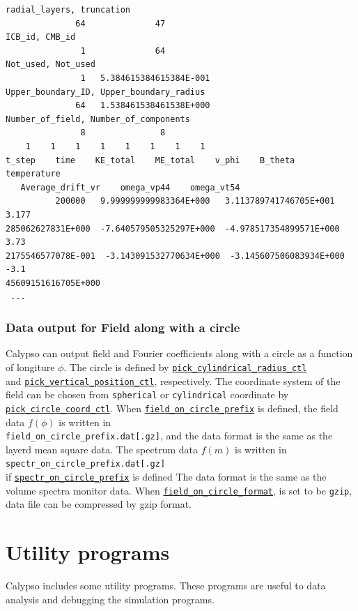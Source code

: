 {\small 
\begin{verbatim}
radial_layers, truncation
              64              47
ICB_id, CMB_id
               1              64
Not_used, Not_used
               1   5.384615384615384E-001
Upper_boundary_ID, Upper_boundary_radius
              64   1.538461538461538E+000
Number_of_field, Number_of_components
               8               8
    1    1    1    1    1    1    1    1
t_step    time    KE_total    ME_total    v_phi    B_theta    temperature 
   Average_drift_vr    omega_vp44    omega_vt54    
          200000   9.999999999983364E+000   3.113789741746705E+001   3.177
285062627831E+000  -7.640579505325297E+000  -4.978517354899571E+000   3.73
2175546577078E-001  -3.143091532770634E+000  -3.145607506083934E+000  -3.1
45609151616705E+000
 ...
\end{verbatim}
}
%
\subsubsection{Data output for Field along with a circle}
Calypso can output field and Fourier coefficients along with a circle as a function of longiture $\phi$. The circle is defined by \hyperref[href_t:pick_cylindrical_radius_ctl]{{\tt pick\_cylindrical\_radius\_ctl}} \\
and \hyperref[href_t:pick_vertical_position_ctl]{{\tt pick\_vertical\_position\_ctl}}, respectively. The coordinate system of the field can be chosen from {\tt spherical} or {\tt cylindrical} coordinate by \hyperref[href_t:pick_circle_coord_ctl]{{\tt pick\_circle\_coord\_ctl}}.
When \hyperref[href_t:field_on_circle_prefix]{{\tt field\_on\_circle\_prefix}} is defined, the field data $f(\phi)$ is written in \\
{\tt field\_on\_circle\_prefix.dat[.gz]}, and the data format is the same as the layerd mean square data.
The spectrum data $f(m)$ is written in {\tt spectr\_on\_circle\_prefix.dat[.gz]} \\
if \hyperref[href_t:spectr_on_circle_prefix]{{\tt spectr\_on\_circle\_prefix}} is defined The data format is the same as the volume spectra monitor data.
When \hyperref[href_t:field_on_circle_format]{{\tt field\_on\_circle\_format}}, is set to be {\tt gzip}, data file can be compressed by gzip format.


\newpage

\section{Utility programs}
Calypso includes some utility programs. These programs are useful to data analysis and debugging the simulation programs.

